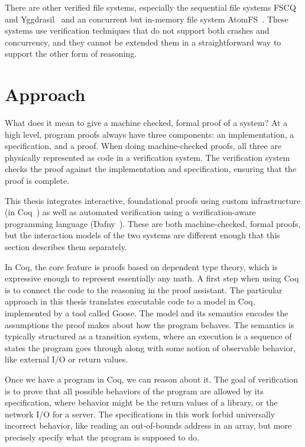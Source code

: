 There are other verified file systems, especially the sequential file systems
FSCQ~\cite{chen:fscq} and Yggdrasil~\cite{sigurbjarnarson:yggdrasil} and an
concurrent but in-memory file system AtomFS~\cite{zou:atomfs}. These systems use
verification techniques that do not support both crashes and concurrency, and they
cannot be extended them in a straightforward way to support the other form of reasoning.

\section{Approach}
\label{sec:intro:approach}

What does it mean to give a machine checked, formal proof of a system? At a high
level, program proofs always have three components: an implementation, a
specification, and a proof. When doing machine-checked proofs, all three are
physically represented as code in a verification system. The verification system
checks the proof against the implementation and specification, ensuring that the
proof is complete.

This thesis integrates interactive, foundational proofs using custom
infrastructure (in Coq~\cite{coq}) as well as automated verification using a
verification-aware programming language (Dafny~\cite{leino:dafny}). These are
both machine-checked, formal proofs, but the interaction models of the two
systems are different enough that this section describes them separately.

In Coq, the core feature is proofs based on dependent type theory, which is
expressive enough to represent essentially any math. A first step when using Coq
is to connect the code to the reasoning in the proof assistant. The particular
approach in this thesis translates executable code to a model in Coq,
implemented by a tool called Goose. The model
and its semantics encodes the
assumptions the proof makes about how the program behaves. The semantics is typically structured as a transition
system, where an execution is a sequence of states the program goes through
along with some notion of observable behavior, like external I/O or return
values.

Once we have a program in Coq, we can reason about it. The goal of
verification is to prove that all possible behaviors of the program are allowed
by its specification, where behavior might be the return values of a library, or
the network I/O for a server. The
specifications in this work forbid universally incorrect behavior, like reading an
out-of-bounds address in an array, but more precisely specify what the program
is supposed to do.

